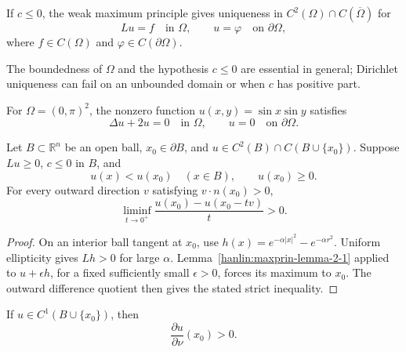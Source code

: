 If $c\le0$, the weak maximum principle gives uniqueness in
$C^2(\Omega)\cap C(\overline\Omega)$ for
\[
Lu=f\quad\text{in }\Omega,
\qquad
u=\varphi\quad\text{on }\partial\Omega,
\]
where $f\in C(\Omega)$ and $\varphi\in C(\partial\Omega)$.

\begin{remark}\label{hanlin:maxprin-remark-2-4}


The boundedness of $\Omega$ and the hypothesis $c\le0$ are essential in general;
Dirichlet uniqueness can fail on an unbounded domain or when $c$ has positive
part.
\end{remark}

\begin{example}\label{hanlin:maxprin-example-2-5}


For $\Omega=(0,\pi)^2$, the nonzero function $u(x,y)=\sin x\sin y$ satisfies
\[
\Delta u+2u=0\quad\text{in }\Omega,
\qquad
u=0\quad\text{on }\partial\Omega.
\]
\end{example}

\begin{theorem}\label{hanlin:maxprin-theorem-2-6}


Let $B\subset\mathbb{R}^n$ be an open ball, $x_0\in\partial B$, and
$u\in C^2(B)\cap C(B\cup\{x_0\})$. Suppose $Lu\ge0$, $c\le0$ in $B$, and
\[
u(x)<u(x_0)\quad(x\in B),
\qquad u(x_0)\ge0.
\]
For every outward direction $v$ satisfying $v\cdot n(x_0)>0$,
\[
\liminf_{t\to0^+}\frac{u(x_0)-u(x_0-tv)}{t}>0.
\]
\end{theorem}
\begin{proof}
\sketch On an interior ball tangent at $x_0$, use
$h(x)=e^{-\alpha|x|^2}-e^{-\alpha r^2}$. Uniform ellipticity gives $Lh>0$
for large $\alpha$. Lemma~\ref{hanlin:maxprin-lemma-2-1} applied to
$u+\epsilon h$, for a fixed sufficiently small $\epsilon>0$, forces its maximum
to $x_0$. The outward difference quotient then gives the stated strict
inequality.
\end{proof}
\begin{remark}\label{hanlin:maxprin-remark-2-7}


If $u\in C^1(B\cup\{x_0\})$, then
\[
\frac{\partial u}{\partial \nu}(x_0) > 0.
\]
\end{remark}

